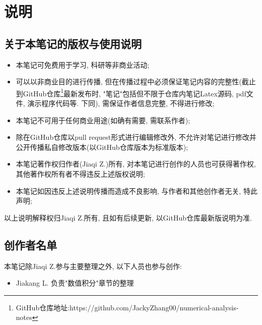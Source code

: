 \chapter{说明}

\section{关于本笔记的版权与使用说明}

\begin{itemize}
    \item 本笔记可免费用于学习, 科研等非商业活动;
    \item 可以以非商业目的进行传播, 但在传播过程中必须保证笔记内容的完整性(截止到GitHub仓库\footnote{GitHub仓库地址:https://github.com/JackyZhang00/numerical-analysis-notes}最新发布时, "笔记"包括但不限于仓库内笔记Latex源码, pdf文件, 演示程序代码等. 下同), 需保证作者信息完整, 不得进行修改;
    \item 本笔记不可用于任何商业用途(如确有需要, 需联系作者);
    \item 除在GitHub仓库以pull request形式进行编辑修改外, 不允许对笔记进行修改并公开传播私自修改版本(以GitHub仓库版本为标准版本);
    \item 本笔记著作权归作者(Jiaqi Z.)所有, 对本笔记进行创作的人员也可获得著作权, 其他著作权所有者不得违反上述版权说明;
    \item 本笔记如因违反上述说明传播而造成不良影响, 与作者和其他创作者无关, 特此声明;
\end{itemize}

以上说明解释权归Jiaqi Z.所有, 且如有后续更新, 以GitHub仓库最新版说明为准.

\section{创作者名单}

本笔记除Jiaqi Z.参与主要整理之外, 以下人员也参与创作:

\begin{itemize}
    \item Jiakang L. 负责"数值积分"章节的整理
\end{itemize}